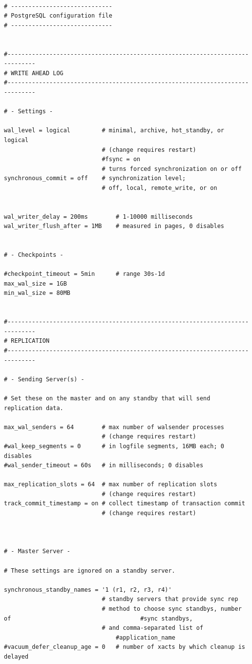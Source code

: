 \vspace{-0.5cm}
\begin{verbatim}
 
# -----------------------------
# PostgreSQL configuration file
# -----------------------------


#------------------------------------------------------------------------------
# WRITE AHEAD LOG
#------------------------------------------------------------------------------

# - Settings -

wal_level = logical			# minimal, archive, hot_standby, or logical
							# (change requires restart)
							#fsync = on					
							# turns forced synchronization on or off
synchronous_commit = off	# synchronization level;
							# off, local, remote_write, or on


wal_writer_delay = 200ms		# 1-10000 milliseconds
wal_writer_flush_after = 1MB	# measured in pages, 0 disables


# - Checkpoints -

#checkpoint_timeout = 5min		# range 30s-1d
max_wal_size = 1GB
min_wal_size = 80MB


#------------------------------------------------------------------------------
# REPLICATION
#------------------------------------------------------------------------------

# - Sending Server(s) -

# Set these on the master and on any standby that will send replication data.

max_wal_senders = 64		# max number of walsender processes
							# (change requires restart)
#wal_keep_segments = 0		# in logfile segments, 16MB each; 0 disables
#wal_sender_timeout = 60s	# in milliseconds; 0 disables

max_replication_slots = 64	# max number of replication slots
							# (change requires restart)
track_commit_timestamp = on	# collect timestamp of transaction commit
							# (change requires restart)



# - Master Server -

# These settings are ignored on a standby server.

synchronous_standby_names = '1 (r1, r2, r3, r4)'
							# standby servers that provide sync rep
							# method to choose sync standbys, number of 									#sync standbys,
							# and comma-separated list of 
								#application_name
#vacuum_defer_cleanup_age = 0	# number of xacts by which cleanup is delayed



\end{verbatim}
